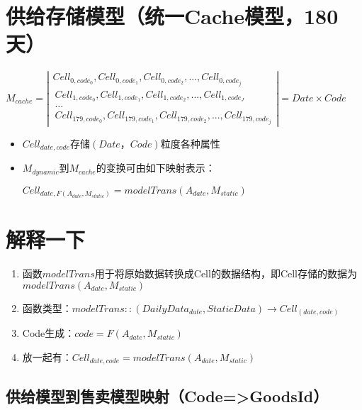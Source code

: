 \documentclass[a4paper]{article}
\begin{document}
\section{供给存储模型（统一Cache模型，180天）}
\begin{center}
    $M_{cache} = 
    \left|\begin{array}{ccc}
        Cell_{0,code_0},Cell_{0,code_1},Cell_{0,code_2},...,Cell_{0,code_j} \\\
        Cell_{1,code_0},Cell_{1,code_1},Cell_{1,code_2},...,Cell_{1,code_J} \\\
        \dots \\\
        Cell_{179,code_0},Cell_{179,code_1},Cell_{179,code_2},...,Cell_{179,code_j}
    \end{array} \right|
    = Date \times Code$
\end{center}

\begin{itemize}
    \item $Cell_{date,code}$存储$(Date，Code)$粒度各种属性
    \item $M_{dynamic}$到$M_{cache}$的变换可由如下映射表示：
    \begin{center}
        $Cell_{date, F(A_{date},M_{static})} = modelTrans(A_{date},M_{static})$
    \end{center}
\end{itemize}

\section{解释一下}
\begin{enumerate}
    \item 函数$modelTrans$用于将原始数据转换成Cell的数据结构，即Cell存储的数据为$modelTrans(A_{date},M_{static})$
    \item 函数类型：$modelTrans::(DailyData_{date}, StaticData) \to Cell_{(date,code)}$
    \item Code生成：$code=F(A_{date},M_{static})$
    \item 放一起有：$Cell_{date,code} = modelTrans(A_{date},M_{static})$
\end{enumerate}
\subsection{ 供给模型到售卖模型映射（Code=>GoodsId）}
\end{document}
